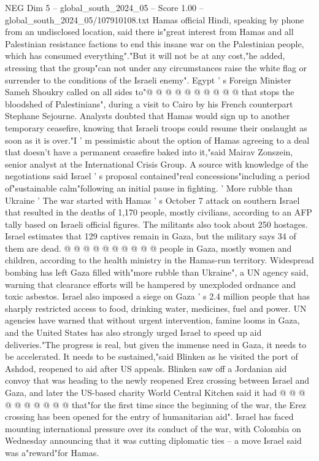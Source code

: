 \begin{textsample}{NEG Dim 5 – global\_south\_2024\_05 – Score 1.00 – global\_south\_2024\_05/107910108.txt}
Hamas official Hindi, speaking by phone from an undisclosed location, said there is"great interest from Hamas and all Palestinian resistance factions to end this insane war on the Palestinian people, which has consumed everything"."But it will not be at any cost,"he added, stressing that the group"can not under any circumstances raise the white flag or surrender to the conditions of the Israeli enemy".
Egypt ' s Foreign Minister Sameh Shoukry called on all sides to"@ @ @ @ @ @ @ @ @ @ that stops the bloodshed of Palestinians", during a visit to Cairo by his French counterpart Stephane Sejourne.
Analysts doubted that Hamas would sign up to another temporary ceasefire, knowing that Israeli troops could resume their onslaught as soon as it is over."I ' m pessimistic about the option of Hamas agreeing to a deal that doesn't have a permanent ceasefire baked into it,"said Mairav Zonszein, senior analyst at the International Crisis Group.
A source with knowledge of the negotiations said Israel ' s proposal contained"real concessions"including a period of"sustainable calm"following an initial pause in fighting. ' More rubble than Ukraine ' The war started with Hamas ' s October 7 attack on southern Israel that resulted in the deaths of 1,170 people, mostly civilians, according to an AFP tally based on Israeli official figures.
The militants also took about 250 hostages.
Israel estimates that 129 captives remain in Gaza, but the military says 34 of them are dead. @ @ @ @ @ @ @ @ @ @ people in Gaza, mostly women and children, according to the health ministry in the Hamas-run territory.
Widespread bombing has left Gaza filled with"more rubble than Ukraine", a UN agency said, warning that clearance efforts will be hampered by unexploded ordnance and toxic asbestos.
Israel also imposed a siege on Gaza ' s 2.4 million people that has sharply restricted access to food, drinking water, medicines, fuel and power.
UN agencies have warned that without urgent intervention, famine looms in Gaza, and the United States has also strongly urged Israel to speed up aid deliveries."The progress is real, but given the immense need in Gaza, it needs to be accelerated.
It needs to be sustained,"said Blinken as he visited the port of Ashdod, reopened to aid after US appeals.
Blinken saw off a Jordanian aid convoy that was heading to the newly reopened Erez crossing between Israel and Gaza, and later the US-based charity World Central Kitchen said it had @ @ @ @ @ @ @ @ @ @ that"for the first time since the beginning of the war, the Erez crossing has been opened for the entry of humanitarian aid".
Israel has faced mounting international pressure over its conduct of the war, with Colombia on Wednesday announcing that it was cutting diplomatic ties -- a move Israel said was a"reward"for Hamas.

\end{textsample}
